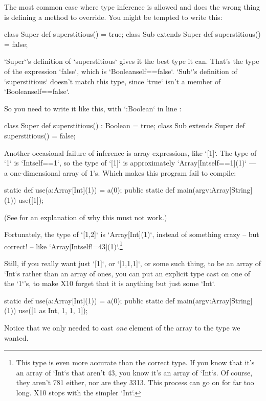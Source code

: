 The most common case where type inference is allowed and does the wrong thing
is defining a method to override.  You might be tempted to write this: 
\begin{xten}
class Super {
  def superstitious() = true;
}
class Sub extends Super {
  def superstitious() = false;
}
\end{xten}
\xcd`Super`'s definition of \xcd`superstitious` gives it the best type it can.
That's the type of the expression \xcd`false`, which is
\xcd`Boolean{self==false}`.  \xcd`Sub`'s definition of \xcd`superstitious`
doesn't match this type, since \xcd`true` isn't a member of 
\xcd`Boolean{self==false}`.

So you need to write it like this, with \xcd`:Boolean` in line
: 
\begin{xtennum}[]
 class Super {
  def superstitious() : Boolean = true;
}
 class Sub extends Super {
  def superstitious() = false;
}
\end{xtennum}

Another occasional failure of inference is array expressions, like 
\xcd`[1]`.  The type of \xcd`1` is \xcd`Int{self==1}`, 
so the type of \xcd`[1]` is approximately 
\xcd`Array[Int{self==1}](1)` --- a one-dimensional array of 1's.  
Which makes this program fail to compile: 
\begin{xten}
static def use(a:Array[Int](1)) = a(0);
public static def main(argv:Array[String](1)) {
  use([1]);
}
\end{xten}
(See  for an explanation of why 
this must not work.)

Fortunately, the type of \xcd`[1,2]` is \xcd`Array[Int](1)`, instead of
something crazy -- but correct! -- like
\xcd`Array[Int{self!=43}](1)`.\footnote{This type is even more accurate than
the correct type.  If you know that it's an array of \xcd`Int`s that aren't
43, you know it's an array of \xcd`Int`s.  Of course, they aren't 781 either,
nor are they 3313. This process can go on for far too long.  X10 stops with
the simpler \xcd`Int`.}

Still, if you really want just \xcd`[1]`, or \xcd`[1,1,1]`, or some such
thing, to be an array of \xcd`Int`s rather than an array of ones, you can
put an explicit type cast on one of the \xcd`1`'s, to make X10 forget that it
is anything but just some \xcd`Int`.  
\begin{xtennum}[]
static def use(a:Array[Int](1)) = a(0);
public static def main(argv:Array[String](1)) {
  use([1 as Int, 1, 1, 1]);
}
\end{xtennum}
Notice that we only needed to cast {\em one} element of the array to the type
we wanted.  



